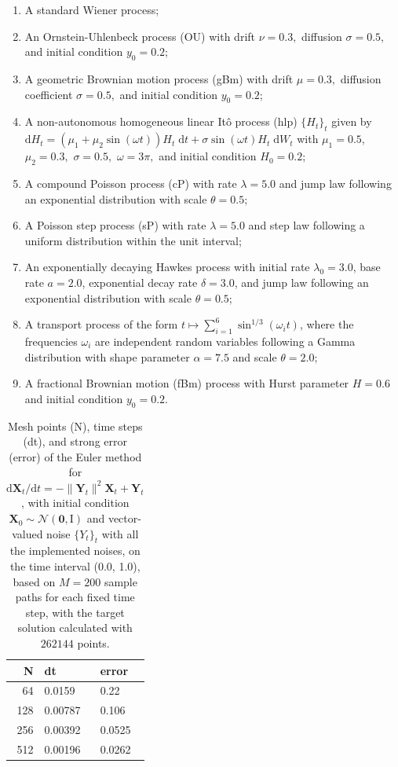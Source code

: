 \documentclass[reqno,12pt]{amsart}
\theoremstyle{plain} %
\theoremstyle{definition} %
\begin{document}
\begin{enumerate}
    \item A standard Wiener process;
    \item An Ornstein-Uhlenbeck process (OU) with drift $\nu = 0.3,$ diffusion $\sigma = 0.5,$ and initial condition $y_0 = 0.2$;
    \item A geometric Brownian motion process (gBm) with drift $\mu = 0.3,$ diffusion coefficient $\sigma = 0.5,$ and initial condition $y_0 = 0.2$;
    \item A non-autonomous homogeneous linear It\^o process (hlp) $\{H_t\}_t$ given by $\mathrm{d}H_t = (\mu_1 + \mu_2\sin(\omega t))H_t\;\mathrm{d}t + \sigma\sin(\omega t)H_t\;\mathrm{d}W_t$ with $\mu_1 = 0.5,$ $\mu_2 = 0.3,$ $\sigma = 0.5,$ $\omega=3\pi,$ and initial condition $H_0 = 0.2;$
    \item A compound Poisson process (cP) with rate $\lambda = 5.0$ and jump law following an exponential distribution with scale $\theta = 0.5;$
    \item A Poisson step process (sP) with rate $\lambda = 5.0$ and step law following a uniform distribution within the unit interval;
    \item An exponentially decaying Hawkes process with initial rate $\lambda_0 = 3.0$, base rate $a = 2.0$, exponential decay rate $\delta = 3.0$, and jump law following an exponential distribution with scale $\theta = 0.5;$
    \item A transport process of the form $t \mapsto \sum_{i=1}^{6} \sin^{1/3}(\omega_i t)$, where the frequencies $\omega_i$ are independent random variables following a Gamma distribution with shape parameter $\alpha = 7.5$ and scale $\theta = 2.0;$
    \item A fractional Brownian motion (fBm) process with Hurst parameter $H=0.6$ and initial condition $y_0 = 0.2$.
\end{enumerate}

\begin{table}
    \begin{tabular}[htb]{|r|l|l|}
        \hline N & dt & error\\
        \hline \hline
        64 & 0.0159 & 0.22 \\
        128 & 0.00787 & 0.106 \\
        256 & 0.00392 & 0.0525 \\
        512 & 0.00196 & 0.0262 \\
        \hline
    \end{tabular}
    \bigskip

    \caption{Mesh points (N), time steps (dt), and strong error (error) of the Euler method for $\mathrm{d}\mathbf{X}_t/\mathrm{d}t = - \| \mathbf{Y}_t\|^2 \mathbf{X}_t + \mathbf{Y}_t$, with initial condition $\mathbf{X}_0 \sim \mathcal{N}(\mathbf{0}, \mathrm{I})$ and vector-valued noise $\{Y_t\}_t$ with all the implemented noises, on the time interval (0.0, 1.0), based on $M = 200$ sample paths for each fixed time step, with the target solution calculated with $262144$ points.}
    \label{taballnoises}
\end{table}
\end{document}
